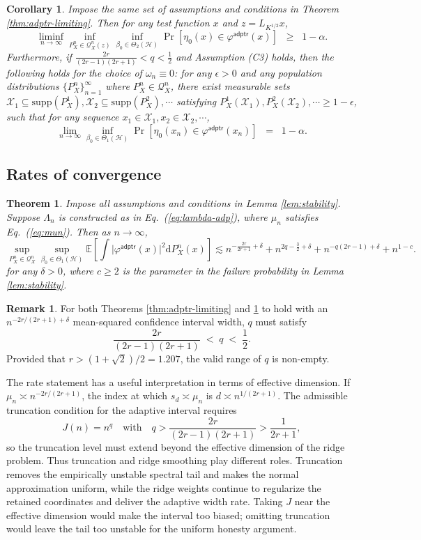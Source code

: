 \documentclass[aos]{imsart}
\newcommand{\supp}{\mathrm{supp}}
\newcommand{\mX}{\mathcal X}
\newcommand{\ud}{\mathrm d}
\newcommand{\mH}{\mathcal H}
\newcommand{\adptr}{\mathsf{adptr}}
\theoremstyle{plain}
\newtheorem{theorem}{Theorem}[section]
\newtheorem{corollary}{Corollary}[section]
\theoremstyle{definition}
\theoremstyle{definition}
\newtheorem{remark}{Remark}[section]
\begin{document}
\begin{corollary}
Impose the same set of assumptions and conditions in Theorem \ref{thm:adptr-limiting}. Then
for any test function $x$ and $z=L_{K^{1/2}}x$,
$$
\liminf_{n\to\infty}\inf_{P_X^n\in\mathcal Q_X^n(z)}\inf_{\beta_0\in\Theta_2(\mH)}\Pr[\eta_0(x)\in\varphi^\adptr(x)] \;\;\geq\;\; 1-\alpha.
$$
Furthermore, if $\frac{2r}{(2r-1)(2r+1)}<q<\frac{1}{2}$ and Assumption (C3) holds, then the following holds for the choice of $\omega_n\equiv 0$:
for any $\epsilon>0$ and any population distributions $\{P_X^n\}_{n=1}^{\infty}$ where $P_X^n\in\mathcal Q_X^n$, there exist measurable sets $\mX_1\subseteq\supp(P_X^1),\mX_2\subseteq\supp(P_X^2),\cdots$ satisfying $P_X^1(\mX_1),P_X^2(\mX_2),\cdots\geq 1-\epsilon$,
such that for any sequence $x_1\in\mX_1,x_2\in\mX_2,\cdots$, 
$$
\lim_{n\to\infty}\inf_{\beta_0\in\Theta_1(\mH)} \Pr[\eta_0(x_n)\in\varphi^\adptr(x_n)] \;\; = \;\; 1-\alpha.
$$
\label{cor:adptr}
\end{corollary}



\subsection{Rates of convergence}


\begin{theorem}
Impose all assumptions and conditions in Lemma \ref{lem:stability}. Suppose $\Lambda_n$ is constructed as in Eq.~(\ref{eq:lambda-adp}),
where $\mu_n$ satisfies Eq.~(\ref{eq:mun}). Then as $n\to\infty$, 
$$
\sup_{P_X^n\in\mathcal Q_X^n}\sup_{\beta_0\in\Theta_1(\mH)}\mathbb E\left[\int \big|\varphi^\adptr(x)\big|^2\ud P_X^n(x) \right] \lesssim n^{-\frac{2r}{2r+1}+\delta} + n^{2q-\frac{3}{2}+\delta} + n^{-q(2r-1)+\delta} + n^{1-c}.
$$
for any $\delta>0$, where $c\geq 2$ is the parameter in the failure probability in Lemma \ref{lem:stability}.
\label{thm:adptr-rates}
\end{theorem}

\begin{remark}
For both Theorems \ref{thm:adptr-limiting} and \ref{thm:adptr-rates} to hold with an $n^{-2r/(2r+1)+\delta}$ mean-squared confidence interval width, $q$ must satisfy
$$
\frac{2r}{(2r-1)(2r+1)}\;<\; q\;<\; \frac{1}{2}.
$$
Provided that $r>(1+\sqrt{2})/2=1.207$, the valid range of $q$ is non-empty.
\end{remark}


The rate statement has a useful interpretation in terms of effective dimension. If $\mu_n\asymp n^{-2r/(2r+1)}$, the index at which $s_d\asymp\mu_n$ is $d\asymp n^{1/(2r+1)}$. The admissible truncation condition for the adaptive interval requires
\[
J(n)=n^q\quad\text{with}\quad q>\frac{2r}{(2r-1)(2r+1)}>\frac{1}{2r+1},
\]
so the truncation level must extend beyond the effective dimension of the ridge problem. Thus truncation and ridge smoothing play different roles. Truncation removes the empirically unstable spectral tail and makes the normal approximation uniform, while the ridge weights continue to regularize the retained coordinates and deliver the adaptive width rate. Taking $J$ near the effective dimension would make the interval too biased; omitting truncation would leave the tail too unstable for the uniform honesty argument.
\end{document}
